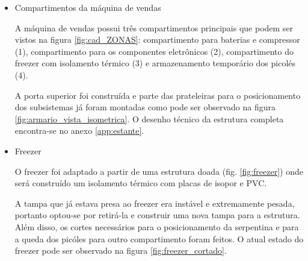 \begin{itemize}
\item Compartimentos da máquina de vendas

A máquina de vendas possui três compartimentos principais que podem ser vistos na figura \ref{fig:cad_ZONAS}: compartimento para baterias e compressor (1), compartimento para os componentes eletrônicos (2), compartimento do freezer com isolamento térmico (3) e armazenamento temporário dos picolés (4).


A porta superior foi construída e parte das prateleiras para o posicionamento dos subsistemas já foram montadas como pode ser observado na figura \ref{fig:armario_vista_isometrica}. O desenho técnico da estrutura completa encontra-se no anexo \ref{app:estante}.



\item Freezer

O freezer foi adaptado a partir de uma estrutura doada (fig. \ref{fig:freezer}) onde será construído um isolamento térmico com placas de isopor e PVC.



A tampa que já estava presa ao freezer era instável e extremamente pesada, portanto optou-se por retirá-la e construir uma nova tampa para a estrutura. Além disso, os cortes necessários para o posicionamento da serpentina e para a queda dos picóles para outro compartimento foram feitos. O atual estado do freezer pode ser observado na figura \ref{fig:freezer_cortado}.



\end{itemize}
